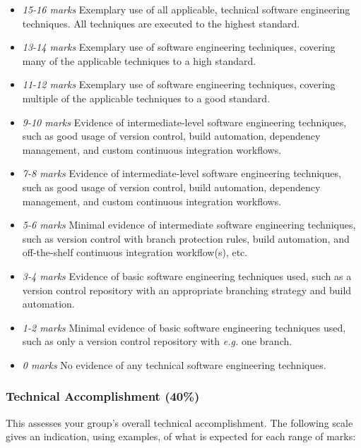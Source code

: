 \begin{itemize}
    \item \emph{15-16 marks} Exemplary use of all applicable, technical software engineering techniques. All techniques are executed to the highest standard.
    \item \emph{13-14 marks} Exemplary use of software engineering techniques, covering many of the applicable techniques to a high standard.
    \item \emph{11-12 marks} Exemplary use of software engineering techniques, covering multiple of the applicable techniques to a good standard.
    \item \emph{9-10 marks} Evidence of intermediate-level software engineering techniques, such as good usage of version control, build automation, dependency management, and custom continuous integration workflows.
    \item \emph{7-8 marks} Evidence of intermediate-level software engineering techniques, such as good usage of version control, build automation, dependency management, and custom continuous integration workflows.
    \item \emph{5-6 marks} Minimal evidence of intermediate software engineering techniques, such as version control with branch protection rules, build automation, and off-the-shelf continuous integration workflow(s), etc.
    \item \emph{3-4 marks} Evidence of basic software engineering techniques used, such as a version control repository with an appropriate branching strategy and build automation.
    \item \emph{1-2 marks} Minimal evidence of basic software engineering techniques used, such as only a version control repository with \emph{e.g.} one branch.
    \item \emph{0 marks} No evidence of any technical software engineering techniques.
\end{itemize}

\subsubsection{Technical Accomplishment (40\%)}

This assesses your group's overall technical accomplishment. The following scale gives an indication, using examples, of what is expected for each range of marks:

